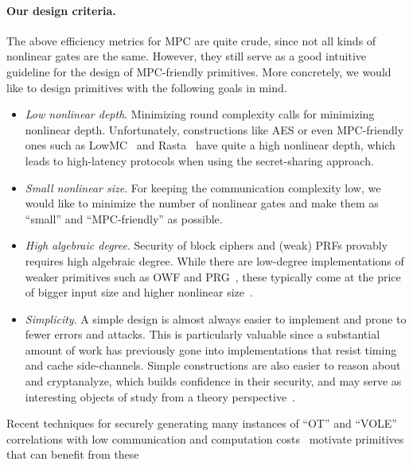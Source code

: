 \paragraph{Our design criteria.}  The above efficiency metrics for MPC are quite crude, since not all kinds of nonlinear gates are the same. However, they still serve as a good intuitive guideline for the design of MPC-friendly primitives. More concretely, we would like to design primitives with the following goals in mind.

\begin{itemize}
    \item \textit{Low nonlinear depth}. Minimizing round complexity calls for minimizing nonlinear depth. Unfortunately, constructions like AES or even MPC-friendly ones such as LowMC~\cite{albrecht2015-lowmc} and Rasta~\cite{Rasta} have quite a high nonlinear depth, which leads to high-latency protocols when using the secret-sharing approach.
    
\item \textit{Small nonlinear size}.
 For keeping the communication complexity low, we would like to minimize the number of nonlinear gates and make them as ``small'' and ``MPC-friendly'' as possible. 

\item \textit{High algebraic degree}.
Security of block ciphers and (weak) PRFs provably requires high algebraic degree. While there are low-degree implementations of weaker primitives such as OWF and PRG~\cite{MQref,Goldreich,ApplebaumIK04}, these typically come at the price of bigger input size and higher nonlinear size~\cite{couteau2018-goldreich-prg}.
    
    \item \textit{Simplicity}.  A simple design is almost always easier to implement and prone to fewer errors and attacks. This is particularly valuable since a substantial amount of work has previously gone into implementations that resist timing and cache side-channels. Simple constructions are also easier to reason about and cryptanalyze, which builds confidence in their security, and may serve as interesting objects of study from a theory perspective~\cite{Goldreich,MilesViola,Akaviaetal}.
\end{itemize}

\iffalse     
    Recent techniques for securely generating many instances of ``OT'' and ``VOLE'' correlations  with low communication and computation costs~\cite{BCGI18,BCGKIS19,more} motivate primitives that can benefit from these
    
